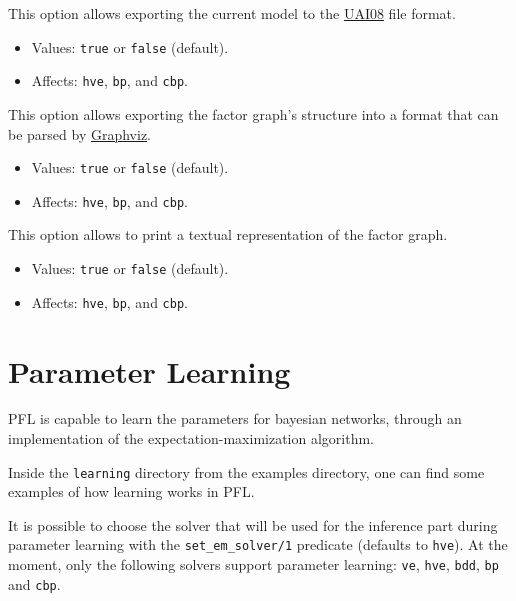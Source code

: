 \documentclass{article}
\begin{document}
This option allows exporting the current model to the \href{http://graphmod.ics.uci.edu/uai08/FileFormat}{UAI08} file format.
\begin{itemize}
  \item Values: \texttt{true} or \texttt{false} (default).
  \item Affects: \texttt{hve}, \texttt{bp}, and \texttt{cbp}.
\end{itemize}


This option allows exporting the factor graph's structure into a format that can be parsed by \href{http://www.graphviz.org/}{Graphviz}.
\begin{itemize}
  \item Values: \texttt{true} or \texttt{false} (default).
  \item Affects: \texttt{hve}, \texttt{bp}, and \texttt{cbp}.
\end{itemize}

This option allows to print a textual representation of the factor graph.
\begin{itemize}
  \item Values: \texttt{true} or \texttt{false} (default).
  \item Affects: \texttt{hve}, \texttt{bp}, and \texttt{cbp}.
\end{itemize}



\section{Parameter Learning}
PFL is capable to learn the parameters for bayesian networks, through an implementation of the expectation-maximization algorithm.

Inside the \texttt{learning} directory from the examples directory, one can find some examples of how learning works in PFL.

It is possible to choose the solver that will be used for the inference part during parameter learning with the \texttt{set\_em\_solver/1} predicate (defaults to \texttt{hve}). At the moment, only the following solvers support parameter learning: \texttt{ve}, \texttt{hve}, \texttt{bdd}, \texttt{bp} and \texttt{cbp}.
\end{document}
